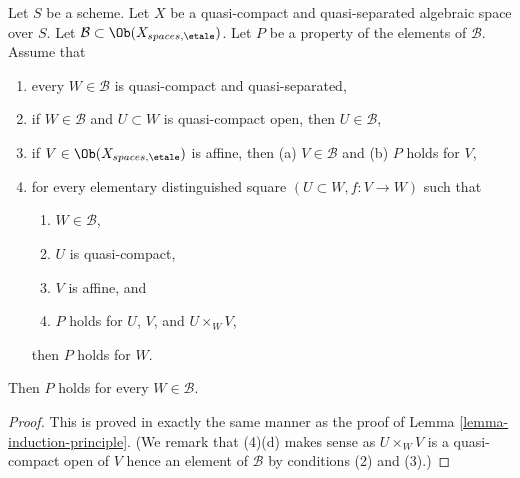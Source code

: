 \begin{lemma}
\label{lemma-induction-principle-separated}
Let $S$ be a scheme. Let $X$ be a quasi-compact and quasi-separated
algebraic space over $S$. Let
$\mathcal{B} \subset \Ob(X_{spaces, \etale})$.
Let $P$ be a property of the elements of $\mathcal{B}$.
Assume that
\begin{enumerate}
\item every $W \in \mathcal{B}$ is quasi-compact and quasi-separated,
\item if $W \in \mathcal{B}$ and $U \subset W$ is quasi-compact open, then
$U \in \mathcal{B}$,
\item if $V \in \Ob(X_{spaces, \etale})$ is affine, then
(a) $V \in \mathcal{B}$ and (b) $P$ holds for $V$,
\item for every elementary distinguished square $(U \subset W, f : V \to W)$
such that
\begin{enumerate}
\item $W \in \mathcal{B}$,
\item $U$ is quasi-compact,
\item $V$ is affine, and
\item $P$ holds for $U$, $V$, and $U \times_W V$,
\end{enumerate}
then $P$ holds for $W$.
\end{enumerate}
Then $P$ holds for every $W \in \mathcal{B}$.
\end{lemma}

\begin{proof}
This is proved in exactly the same manner as the proof of
Lemma \ref{lemma-induction-principle}.
(We remark that (4)(d) makes sense as $U \times_W V$ is a quasi-compact
open of $V$ hence an element of $\mathcal{B}$ by conditions
(2) and (3).)
\end{proof}

